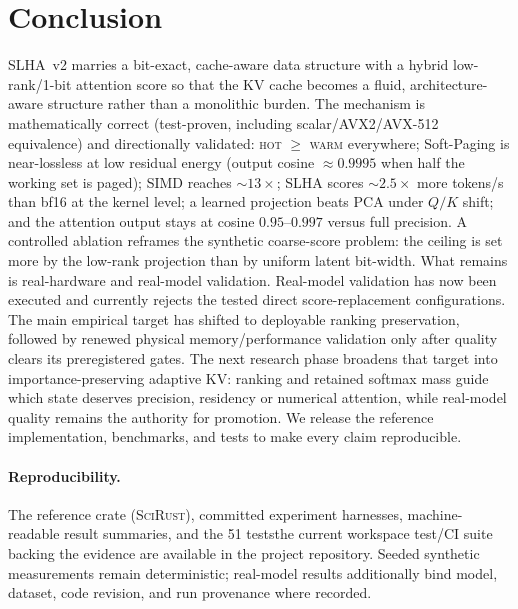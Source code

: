 \documentclass[11pt]{article}
\newcommand{\added}[1]{\textcolor{revisionblue}{#1}}
\newcommand{\deleted}[1]{\textcolor{revisionred}{#1}}
\theoremstyle{plain}
\theoremstyle{definition}
\begin{document}
\section{Conclusion}
\label{sec:conclusion}
SLHA~v2 marries a bit-exact, cache-aware data structure with a hybrid
low-rank/1-bit attention score so that the KV cache becomes a fluid,
architecture-aware structure rather than a monolithic burden. The
mechanism is mathematically correct (test-proven, including
scalar/AVX2/AVX-512 equivalence) and directionally validated:
\textsc{hot} $\ge$ \textsc{warm} everywhere; Soft-Paging is near-lossless
at low residual energy (output cosine $\approx 0.9995$ when half the
working set is paged); SIMD reaches $\sim\!13\times$;
SLHA scores $\sim\!2.5\times$ more tokens/s than bf16 at the kernel
level; a learned projection beats PCA under $Q/K$ shift; and the
attention output stays at cosine $0.95$--$0.997$ versus full precision. A
controlled ablation reframes the synthetic coarse-score problem:
the ceiling is set more by the low-rank projection than by uniform latent
bit-width. \deleted{What remains is real-hardware and real-model validation.}
\added{Real-model validation has now been executed and currently rejects the
tested direct score-replacement configurations. The main empirical target has
shifted to deployable ranking preservation, followed by renewed physical
memory/performance validation only after quality clears its preregistered
gates. The next research phase broadens that target into importance-preserving
adaptive KV: ranking and retained softmax mass guide which state deserves
precision, residency or numerical attention, while real-model quality remains
the authority for promotion.} We release the reference implementation,
benchmarks, and tests to make every claim reproducible.

\paragraph{Reproducibility.}
The reference crate (\textsc{SciRust}), committed experiment harnesses,
machine-readable result summaries, and \deleted{the 51 tests}\added{the current
workspace test/CI suite} backing the evidence are available in the project
repository. Seeded synthetic measurements remain deterministic; real-model
results additionally bind model, dataset, code revision, and run provenance
where recorded.
\end{document}
